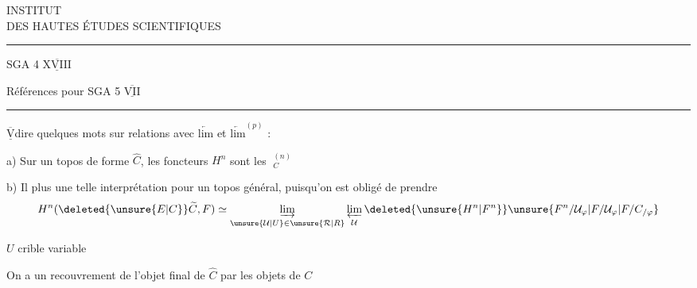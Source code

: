 \begin{center}
INSTITUT\\
DES HAUTES ÉTUDES SCIENTIFIQUES\\
\rule{2.3em}{0.4pt}
\end{center}

SGA 4 $\underline{\overline{\mathrm{XVIII}}}$ 

Références pour SGA 5 $\underline{\overline{\mathrm{VII}}}$

\noindent\rule{\linewidth}{0.4pt}

$\underline{\overline{\mathrm{V}}}$\qquad dire quelques mots sur relations avec $\underleftarrow{\mathrm{lim}}$ et \({\underleftarrow{\mathrm{lim}}}^{(p)}\) :

a) Sur un topos de  forme $\widehat C$, les foncteurs $H^n$ sont les $\mathop{\underleftarrow{\mathrm{lim}}}\nolimits_C^{(n)}$

b) Il  plus une telle interprétation pour un topos général, puisqu'on est obligé de prendre
\[
 H^{n}(\deleted{\unsure{E|C}}\widetilde C,F)\simeq
 \mathop{\underrightarrow{\mathrm{lim}}}_{\unsure{\mathcal U|U}\in\unsure{\mathcal R|R}}
 \mathop{\underleftarrow{\mathrm{lim}}}_{\mathcal U}
 \deleted{\unsure{H^n|F^n}}\unsure{F^{n}/\mathcal U_{\varphi}|F/\mathcal U_{\varphi}|F/C_{/\varphi}}
\]

$U$ crible variable

On a un recouvrement de l'objet final de $\widehat C$ par les objets de $C$


